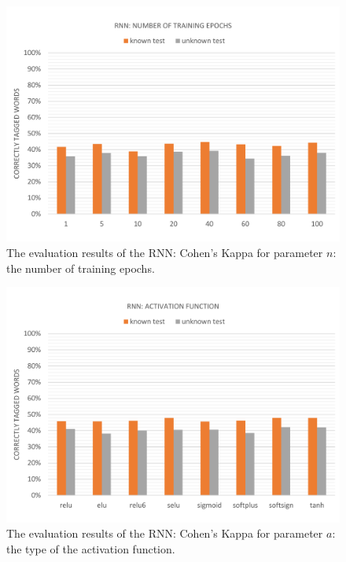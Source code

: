 \begin{figure}[H]
	\hspace{-5mm}\includegraphics[width=1.07\textwidth]{images/evaluation_rnn_n}
	\caption[RNN Evaluation: Number of Training Epochs]{The evaluation results of the RNN: Cohen's Kappa for parameter $n$: the number of training epochs.}
	\label{f.evaluation.rnn.n}
\end{figure}

\begin{figure}[H]
	\hspace{-5mm}\includegraphics[width=1.07\textwidth]{images/evaluation_rnn_a}
	\caption[RNN Evaluation: Activation Function]{The evaluation results of the RNN: Cohen's Kappa for parameter $a$: the type of the activation function.}
	\label{f.evaluation.rnn.a}
\end{figure}

